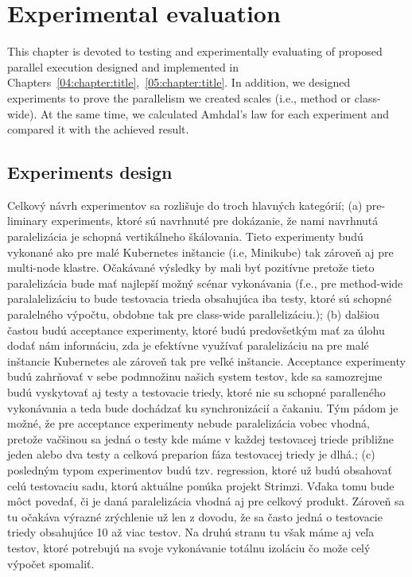 \chapter{Experimental evaluation}
\label{06:chapter:title}

This chapter is devoted to testing and experimentally evaluating of proposed parallel execution designed and implemented in
Chapters~\ref{04:chapter:title},~\ref{05:chapter:title}.
In addition, we designed experiments to prove the parallelism we created scales (i.e., method or class-wide).
At the same time, we calculated Amhdal's law for each experiment and compared it with the achieved result.

\section{Experiments design}

Celkový návrh experimentov sa rozlišuje do troch hlavných kategórií; (a) pre-liminary experiments, ktoré sú navrhnuté
pre dokázanie, že nami navrhnutá paralelizácia je schopná vertikálneho škálovania. Tieto experimenty budú vykonané
ako pre malé Kubernetes inštancie (i.e, Minikube) tak zároveň aj pre multi-node klastre. Očakávané výsledky by mali
byť pozitívne pretože tieto paralelizácia bude mať najlepší možný scénar vykonávania (f.e., pre method-wide paralalelizáciu
to bude testovacia trieda obsahujúca iba testy, ktoré sú schopné paralelného výpočtu, obdobne tak pre class-wide parallelizáciu.);
(b) dalšiou častou budú acceptance experimenty, ktoré budú predovšetkým mať za úlohu dodať nám informáciu, zda je efektívne
využívať paralelizáciu na pre malé inštancie Kubernetes ale zároveň tak pre veľké inštancie. Acceptance experimenty
budú zahrňovať v sebe podmnožinu našich system testov, kde sa samozrejme budú vyskytovať aj testy a testovacie triedy,
ktoré nie su schopné paralleného vykonávania a teda bude dochádzať ku synchronizácií a čakaniu. Tým pádom je možné, že
pre acceptance experimenty nebude paralelizácia vobec vhodná, pretože vačšinou sa jedná o testy kde máme v každej
testovacej triede približne jeden alebo dva testy a celková preparion fáza testovacej triedy je dlhá.; (c) posledným
typom experimentov budú tzv. regression, ktoré už budú obsahovať celú testovaciu sadu, ktorú aktuálne ponúka projekt Strimzi.
Vďaka tomu bude môct povedať, či je daná paralelizácia vhodná aj pre celkový produkt. Zároveň sa tu očakáva výrazné zrýchlenie
už len z dovodu, že sa často jedná o testovacie triedy obsahujúce 10 až viac testov. Na druhú stranu tu však máme aj veľa
testov, ktoré potrebujú na svoje vykonávanie totálnu izoláciu čo može celý výpočet spomaliť.

